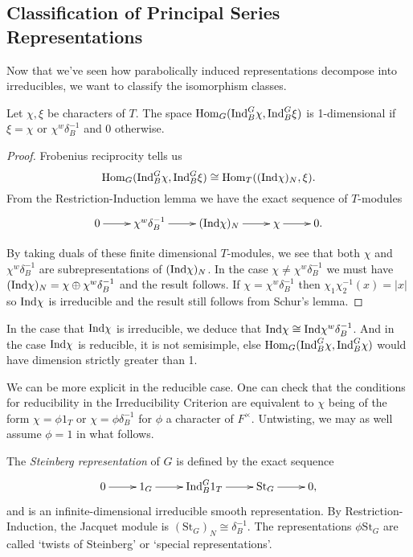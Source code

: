 \subsection{Classification of Principal Series Representations}


Now that we've seen how parabolically induced representations decompose into irreducibles, we want to classify the isomorphism classes.

\begin{prop}
    Let $\chi, \xi$ be characters of $T$. The space $\mathrm{Hom}_G(\mathrm{Ind}_B^G \chi, \mathrm{Ind}_B^G \xi)$ is 1-dimensional if $\xi = \chi$ or $\chi^w \delta_B^{-1}$ and 0 otherwise.
\end{prop}
\begin{proof}
    Frobenius reciprocity tells us
    $$\mathrm{Hom}_G(\mathrm{Ind}_B^G \chi, \mathrm{Ind}_B^G \xi) \cong \mathrm{Hom}_T((\mathrm{Ind} \chi)_N, \xi).$$
    From the Restriction-Induction lemma we have the exact sequence of $T$-modules
    $$\xymatrix{0 \ar[r] & \chi^w \delta_B^{-1} \ar[r] & (\Ind \chi)_N \ar[r] & \chi \ar[r] & 0.}$$

    By taking duals of these finite dimensional $T$-modules, we see that both $\chi$ and $\chi^w \delta_B^{-1}$ are subrepresentations of $(\mathrm{Ind} \chi)_N$. In the case $\chi \neq \chi^w \delta_B^{-1}$ we must have $(\mathrm{Ind} \chi)_N = \chi \oplus \chi^w \delta_B^{-1}$ and the result follows. If $\chi = \chi^w \delta_B^{-1}$ then $\chi_1\chi_2^{-1} (x) = |x|$ so $\mathrm{Ind} \chi$ is irreducible and the result still follows from Schur's lemma.
\end{proof}

\begin{rem}
In the case that $\mathrm{Ind} \chi$ is irreducible, we deduce that $\mathrm{Ind} \chi \cong \mathrm{Ind} \chi^w \delta_B^{-1}$. And in the case $\mathrm{Ind} \chi$ is reducible, it is not semisimple, else $\mathrm{Hom}_G(\mathrm{Ind}_B^G \chi, \mathrm{Ind}_B^G \chi)$ would have dimension strictly greater than 1.
\end{rem}

We can be more explicit in the reducible case. One can check that the conditions for reducibility in the Irreducibility Criterion are equivalent to $\chi$ being of the form $\chi = \phi 1_T$ or $\chi =\phi \delta_B^{-1}$ for $\phi$ a character of $F^\times$. Untwisting, we may as well assume $\phi=1$ in what follows.

\begin{defn}
    The \textit{Steinberg representation} of $G$ is defined by the exact sequence
    $$\xymatrix{0 \ar[r] & 1_G \ar[r] & \Ind_B^G 1_T \ar[r] & \mathrm{St}_G \ar[r] & 0,}$$ and is an infinite-dimensional irreducible smooth representation. By Restriction-Induction, the Jacquet module is $(\mathrm{St}_G)_N \cong \delta_B^{-1}$. The representations $\phi \mathrm{St}_G$ are called `twists of Steinberg' or `special representations'.
\end{defn}

